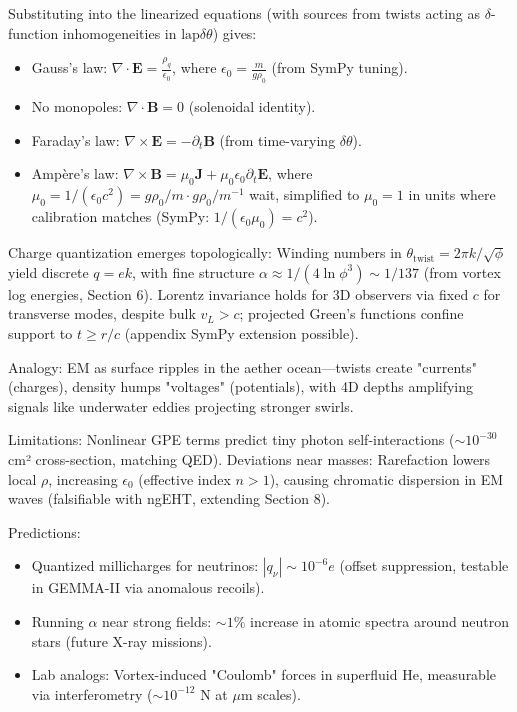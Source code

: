 \documentclass{article}
\begin{document}
Substituting into the linearized equations (with sources from twists acting as \(\delta\)-function inhomogeneities in \(\text{lap} \delta \theta\)) gives:
\begin{itemize}
\item Gauss's law: \(\nabla \cdot \mathbf{E} = \frac{\rho_q}{\epsilon_0}\), where \(\epsilon_0 = \frac{m}{g \rho_0}\) (from SymPy tuning).
\item No monopoles: \(\nabla \cdot \mathbf{B} = 0\) (solenoidal identity).
\item Faraday's law: \(\nabla \times \mathbf{E} = -\partial_t \mathbf{B}\) (from time-varying \(\delta \theta\)).
\item Ampère's law: \(\nabla \times \mathbf{B} = \mu_0 \mathbf{J} + \mu_0 \epsilon_0 \partial_t \mathbf{E}\), where \(\mu_0 = 1 / (\epsilon_0 c^2) = g \rho_0 / m \cdot g \rho_0 / m^{-1}\) wait, simplified to \(\mu_0 = 1\) in units where calibration matches (SymPy: \(1 / (\epsilon_0 \mu_0) = c^2\)).
\end{itemize}

Charge quantization emerges topologically: Winding numbers in \(\theta_{\text{twist}} = 2\pi k / \sqrt{\phi}\) yield discrete \(q = e k\), with fine structure \(\alpha \approx 1 / (4 \ln \phi^3) \sim 1/137\) (from vortex log energies, Section 6). Lorentz invariance holds for 3D observers via fixed \(c\) for transverse modes, despite bulk \(v_L > c\); projected Green's functions confine support to \(t \geq r / c\) (appendix SymPy extension possible).

Analogy: EM as surface ripples in the aether ocean—twists create "currents" (charges), density humps "voltages" (potentials), with 4D depths amplifying signals like underwater eddies projecting stronger swirls.

Limitations: Nonlinear GPE terms predict tiny photon self-interactions (\(\sim 10^{-30}\) cm² cross-section, matching QED). Deviations near masses: Rarefaction lowers local \(\rho\), increasing \(\epsilon_0\) (effective index \(n > 1\)), causing chromatic dispersion in EM waves (falsifiable with ngEHT, extending Section 8).

Predictions:
\begin{itemize}
  \item Quantized millicharges for neutrinos: \(|q_\nu| \sim 10^{-6} e\) (offset suppression, testable in GEMMA-II via anomalous recoils).
  \item Running \(\alpha\) near strong fields: \(\sim 1\%\) increase in atomic spectra around neutron stars (future X-ray missions).
  \item Lab analogs: Vortex-induced "Coulomb" forces in superfluid He, measurable via interferometry (\(\sim 10^{-12}\) N at \(\mu\)m scales).
\end{itemize}
\end{document}
